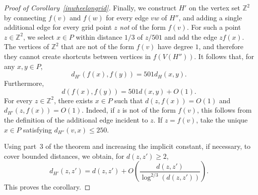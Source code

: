 \documentclass[10pt,a4paper]{amsart}
\newcommand{\ZZ}{{\mathbb Z}}
\begin{document}
\begin{proof}[Proof of Corollary~\ref{inwheelongrid}]
Finally, we construct $H'$ on the vertex set $\ZZ^2$ by connecting $f(v)$ and $f(w)$ for every edge $vw$ of $H''$, and adding a single additional edge for every grid point $z$ \emph{not} of the form $f(v)$. For such a point $z\in\ZZ^2$, we select $x\in P$ within distance $1/3$ of $z/501$ and add the edge $zf(x)$. The vertices of $\ZZ^2$ that are not of the form $f(v)$ have degree $1$, and therefore they cannot create shortcuts between vertices in $f(V(H''))$. It follows that, for any $x,y\in P$,
$$
d_{H'}(f(x),f(y))=501d_H(x,y).
$$
Furthermore,
$$
d(f(x),f(y))=501d(x,y)+O(1).
$$
For every $z\in\ZZ^2$, there exists $x\in P$ such that
$d(z,f(x))=O(1)$ and $d_{H'}(z,f(x))=O(1).$ Indeed, if $z$ is not of the form $f(v)$, this follows from the definition of the additional edge incident to $z$. If $z=f(v)$, take the unique $x\in P$ satisfying $d_{H''}(v,x)\leq250$.

Using part~3 of the theorem and increasing the implicit constant, if necessary, to cover bounded distances, we obtain, for $d(z,z')\geq 2$,
$$d_{H'}(z,z')=d(z,z')+O\left(\frac{d(z,z')}{\log^{2/3}(d(z,z'))}\right).$$
This proves the corollary.
\end{proof}
\end{document}
